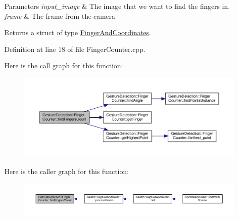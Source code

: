 \begin{DoxyParams}{Parameters}
{\em input\+\_\+image} & The image that we want to find the fingers in. \\
\hline
{\em frame} & The frame from the camera\\
\hline
\end{DoxyParams}
\begin{DoxyReturn}{Returns}
a struct of type \hyperlink{class_gesture_detection_1_1_finger_and_coordinates}{Finger\+And\+Coordinates}. 
\end{DoxyReturn}


Definition at line 18 of file Finger\+Counter.\+cpp.

Here is the call graph for this function\+:
\nopagebreak
\begin{figure}[H]
\begin{center}
\leavevmode
\includegraphics[width=350pt]{class_gesture_detection_1_1_finger_counter_a611201352a86dd943f866c1be9507081_cgraph}
\end{center}
\end{figure}
Here is the caller graph for this function\+:
\nopagebreak
\begin{figure}[H]
\begin{center}
\leavevmode
\includegraphics[width=350pt]{class_gesture_detection_1_1_finger_counter_a611201352a86dd943f866c1be9507081_icgraph}
\end{center}
\end{figure}
\mbox{\label{class_gesture_detection_1_1_finger_counter_a51fdf57f5f19911f34778e925d50b480}} 
